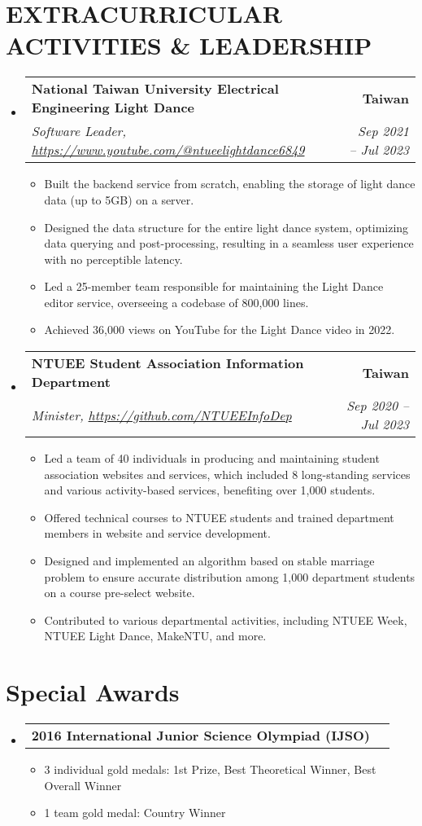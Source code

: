 \documentclass[letterpaper,8pt]{article}
\makeatletter
\newcommand{\resumeItem}[1]{
  \item\small{
    {#1 \vspace{-2pt}}
  }
}
\newcommand{\resumeSubheading}[4]{
    \item
    \begin{tabular*}{1.0\textwidth}[t]{l@{\extracolsep{\fill}}r}
      \textbf{#1} & \textbf{\small #2} \\
      \textit{\small#3} & \textit{\small #4} \\
    \end{tabular*}\vspace{-7pt}
}
\newcommand{\resumeProjectHeading}[2]{
    \item
    \begin{tabular*}{1.001\textwidth}{l@{\extracolsep{\fill}}r}
      #1 & \textbf{#2}\\
    \end{tabular*}\vspace{-5pt}
}
\newcommand{\resumeSubHeadingListStart}{\begin{itemize}[leftmargin=0.0in, label={}]}
\newcommand{\resumeSubHeadingListEnd}{\end{itemize}}
\newcommand{\resumeItemListStart}{\begin{itemize}}
\newcommand{\resumeItemListEnd}{\end{itemize}\vspace{-5pt}}
\makeatother
\begin{document}
\section{EXTRACURRICULAR ACTIVITIES \& LEADERSHIP}
    \resumeSubHeadingListStart
        \resumeSubheading{National Taiwan University Electrical Engineering Light Dance}{Taiwan}
        {Software Leader, \textit{\href{https://www.youtube.com/@ntueelightdance6849}{https://www.youtube.com/@ntueelightdance6849}}}{\textnormal{Sep 2021 -- Jul 2023}}
            \resumeItemListStart
                \resumeItem{Built the backend service from scratch, enabling the storage of light dance data (up to 5GB) on a server.}
                \resumeItem{Designed the data structure for the entire light dance system, optimizing data querying and post-processing, resulting in a seamless user experience with no perceptible latency.}
                \resumeItem{Led a 25-member team responsible for maintaining the Light Dance editor service, overseeing a codebase of 800,000 lines.}
                \resumeItem{Achieved 36,000 views on YouTube for the Light Dance video in 2022.}
            \resumeItemListEnd
    \resumeSubHeadingListEnd
    \resumeSubHeadingListStart
    \resumeSubheading{NTUEE Student Association Information Department}{Taiwan}
        {Minister, \textit{\href{https://github.com/NTUEEInfoDep}{https://github.com/NTUEEInfoDep}}}{\textnormal{Sep 2020 -- Jul 2023}}
        \resumeItemListStart
            \resumeItem{Led a team of 40 individuals in producing and maintaining student association websites and services, which included 8 long-standing services and various activity-based services, benefiting over 1,000 students.}
            \resumeItem{Offered technical courses to NTUEE students and trained department members in website and service development.}
            \resumeItem{Designed and implemented an algorithm based on stable marriage problem to ensure accurate distribution among 1,000 department students on a course pre-select website.}
            \resumeItem{Contributed to various departmental activities, including NTUEE Week, NTUEE Light Dance, MakeNTU, and more.}
        \resumeItemListEnd
\resumeSubHeadingListEnd
\vspace{-12pt}
%
\section{Special Awards}
\resumeSubHeadingListStart
  \resumeProjectHeading{\textbf{2016 International Junior Science Olympiad (IJSO)}}{}
    \resumeItemListStart  
      \resumeItem{3 individual gold medals: 1st Prize, Best Theoretical Winner, Best Overall Winner}
      \resumeItem{1 team gold medal: Country Winner}
    \resumeItemListEnd
\resumeSubHeadingListEnd
\end{document}
